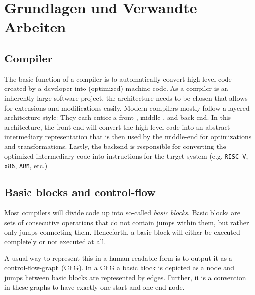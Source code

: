 \chapter{Grundlagen und Verwandte Arbeiten}\label{sec:basics}




\section{Compiler}\label{sec:basics:compiler}

The basic function of a compiler is to automatically convert high-level code created by a developer into (optimized) machine code.
As a compiler is an inherently large software project, the architecture needs to be chosen that allows for extensions and modifications easily.
Modern compilers mostly follow a layered architecture style: They each entice a front-, middle-, and back-end.
In this architecture, the front-end will convert the high-level code into an abstract intermediary representation that is then used by the middle-end for optimizations and transformations.
Lastly, the backend is responsible for converting the optimized intermediary code into instructions for the target system (e.g. \texttt{RISC-V}, \texttt{x86}, \texttt{ARM}, etc.)

\section{Basic blocks and control-flow}\label{sec:basics:bb-cf}

Most compilers will divide code up into so-called \textit{basic blocks}.
Basic blocks are sets of consecutive operations that do not contain jumps within them, but rather only jumps connecting them.
Henceforth, a basic block will either be executed completely or not executed at all.

A usual way to represent this in a human-readable form is to output it as a control-flow-graph (CFG).
In a CFG a basic block is depicted as a node and jumps between basic blocks are represented by edges.
Further, it is a convention in these graphs to have exactly one start and one end node.

